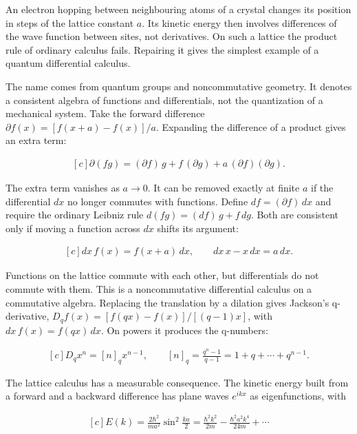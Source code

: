\documentclass[11pt,oneside]{book}
\newenvironment{centeredalign}{\[\begin{gathered}[c]}{\end{gathered}\]}
\begin{document}
An electron hopping between neighbouring atoms of a crystal changes its position in steps of the lattice constant \(a\). Its kinetic energy then involves differences of the wave function between sites, not derivatives. On such a lattice the product rule of ordinary calculus fails. Repairing it gives the simplest example of a quantum differential calculus.

The name comes from quantum groups and noncommutative geometry. It denotes a consistent algebra of functions and differentials, not the quantization of a mechanical system. Take the forward difference \(\partial f(x)=[f(x+a)-f(x)]/a\). Expanding the difference of a product gives an extra term:

\begin{centeredalign}
\partial(fg)=(\partial f)\,g+f\,(\partial g)+a\,(\partial f)(\partial g).
\end{centeredalign}

The extra term vanishes as \(a\to0\). It can be removed exactly at finite \(a\) if the differential \(dx\) no longer commutes with functions. Define \(df=(\partial f)\,dx\) and require the ordinary Leibniz rule \(d(fg)=(df)\,g+f\,dg\). Both are consistent only if moving a function across \(dx\) shifts its argument:

\begin{centeredalign}
dx\,f(x)=f(x+a)\,dx,\qquad dx\,x-x\,dx=a\,dx.
\end{centeredalign}

Functions on the lattice commute with each other, but differentials do not commute with them. This is a noncommutative differential calculus on a commutative algebra. Replacing the translation by a dilation gives Jackson's q-derivative, \(D_qf(x)=[f(qx)-f(x)]/[(q-1)x]\), with \(dx\,f(x)=f(qx)\,dx\). On powers it produces the q-numbers:

\begin{centeredalign}
D_qx^n=[n]_qx^{n-1},\qquad [n]_q=\frac{q^n-1}{q-1}=1+q+\cdots+q^{n-1}.
\end{centeredalign}

The lattice calculus has a measurable consequence. The kinetic energy built from a forward and a backward difference has plane waves \(e^{ikx}\) as eigenfunctions, with

\begin{centeredalign}
E(k)=\frac{2\hbar^2}{ma^2}\sin^2\frac{ka}{2}
=\frac{\hbar^2k^2}{2m}-\frac{\hbar^2a^2k^4}{24m}+\cdots
\end{centeredalign}
\end{document}
